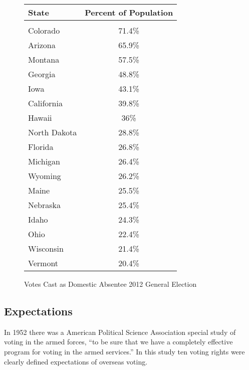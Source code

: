 \begin{figure}
\begin{center}
\begin{tabular}{l c}
{\bf State} & {\bf Percent of Population}\\\hline\\
Colorado & 71.4\%\\
Arizona & 65.9\%\\
Montana & 57.5\%\\
Georgia & 48.8\%\\
Iowa & 43.1\%\\
California & 39.8\%\\
Hawaii & 36\%\\
North Dakota & 28.8\%\\
Florida & 26.8\%\\
Michigan & 26.4\%\\
Wyoming & 26.2\%\\
Maine & 25.5\%\\
Nebraska & 25.4\%\\
Idaho & 24.3\%\\
Ohio & 22.4\%\\
Wisconsin & 21.4\%\\
Vermont & 20.4\%\\
\end{tabular}
\end{center}
\caption{Votes Cast as Domestic Absentee 2012 General Election}
\label{fig:domestic_populations}
\end{figure}

\subsection{Expectations}

In 1952 there was a American Political Science Association special study of
voting in the armed forces, ``to be sure that we have a completely effective
program for voting in the armed services.'' In this study ten voting rights
were clearly defined expectations of overseas voting.

